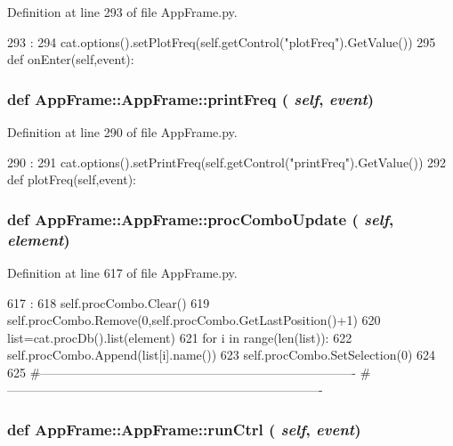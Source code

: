 Definition at line 293 of file AppFrame.py.


\begin{DoxyCode}
293                             :
294         cat.options().setPlotFreq(self.getControl("plotFreq").GetValue()) 
295 
    def onEnter(self,event):
\end{DoxyCode}
\hypertarget{classAppFrame_1_1AppFrame_a3319c92de38f17675b2debf064add617}{
\subsubsection[{printFreq}]{\setlength{\rightskip}{0pt plus 5cm}def AppFrame::AppFrame::printFreq ( {\em self}, \/   {\em event})}}
\label{classAppFrame_1_1AppFrame_a3319c92de38f17675b2debf064add617}


Definition at line 290 of file AppFrame.py.


\begin{DoxyCode}
290                              :
291         cat.options().setPrintFreq(self.getControl("printFreq").GetValue()) 
292 
    def plotFreq(self,event):
\end{DoxyCode}
\hypertarget{classAppFrame_1_1AppFrame_afeddbb4dfa87ced566b15d905eed4756}{
\subsubsection[{procComboUpdate}]{\setlength{\rightskip}{0pt plus 5cm}def AppFrame::AppFrame::procComboUpdate ( {\em self}, \/   {\em element})}}
\label{classAppFrame_1_1AppFrame_afeddbb4dfa87ced566b15d905eed4756}


Definition at line 617 of file AppFrame.py.


\begin{DoxyCode}
617                                       :
618         self.procCombo.Clear()
619         self.procCombo.Remove(0,self.procCombo.GetLastPosition()+1)
620         list=cat.procDb().list(element)
621         for i in range(len(list)):
622             self.procCombo.Append(list[i].name())
623         self.procCombo.SetSelection(0)    
624  
625 #----------------------------------------------------------------------------
#----------------------------------------------------------------------------
\end{DoxyCode}
\hypertarget{classAppFrame_1_1AppFrame_a89e4b810a8f76474c63307ab353b95ae}{
\subsubsection[{runCtrl}]{\setlength{\rightskip}{0pt plus 5cm}def AppFrame::AppFrame::runCtrl ( {\em self}, \/   {\em event})}}
\label{classAppFrame_1_1AppFrame_a89e4b810a8f76474c63307ab353b95ae}


